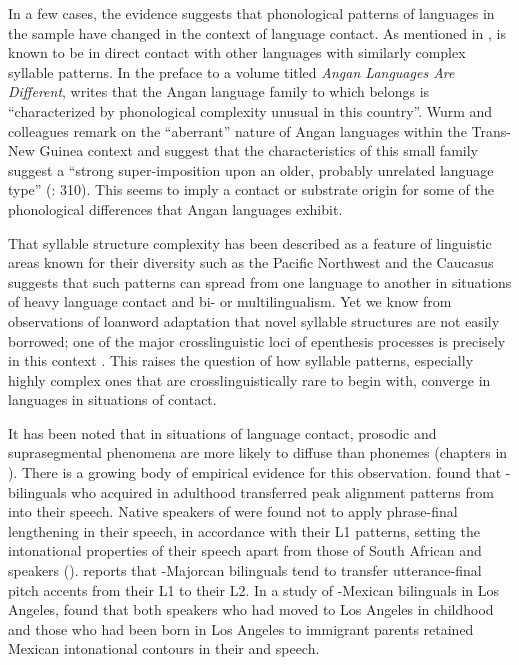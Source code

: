   In a few cases, the evidence suggests that phonological patterns of languages in the sample have changed in the context of language contact. As mentioned in ,  is known to be in direct contact with other languages with similarly complex syllable patterns. In the preface to a volume titled \textit{Angan Languages Are Different}, \citet[4]{Healey1981} writes that the Angan language family to which  belongs is “characterized by phonological complexity unusual in this country”. Wurm and colleagues remark on the “aberrant” nature of Angan languages within the Trans-New Guinea context and suggest that the characteristics of this small family suggest a “strong super-imposition upon an older, probably unrelated language type” (\citeyear{WurmEtAl1977}: 310). This seems to imply a contact or substrate origin for some of the phonological differences that Angan languages exhibit.

  That syllable structure complexity has been described as a feature of linguistic areas known for their diversity such as the Pacific Northwest and the Caucasus suggests that such patterns can spread from one language to another in situations of heavy language contact and bi- or multilingualism. Yet we know from observations of loanword adaptation that novel syllable structures are not easily borrowed; one of the major crosslinguistic loci of epenthesis processes is precisely in this context \citep{Hall2011}. This raises the question of how syllable patterns, especially highly complex ones that are crosslinguistically rare to begin with, converge in languages in situations of contact.

  It has been noted that in situations of language contact, prosodic and suprasegmental phenomena are more likely to diffuse than phonemes (chapters in \citealt{AikhenvaldDixon2001b}). There is a growing body of empirical evidence for this observation. \citet{Mennen2004} found that - bilinguals who acquired  in adulthood transferred peak alignment patterns from  into their  speech. Native speakers of  were found not to apply phrase-final lengthening in their  speech, in accordance with their L1 patterns, setting the intonational properties of their speech apart from those of South African  and   speakers (\citealt{CoetzeeWissing2007}). \citet{Simonet2011} reports that -Majorcan  bilinguals tend to transfer utterance-final pitch accents from their L1 to their L2. In a study of -Mexican  bilinguals in Los Angeles, \citet{Robles-Puente2014} found that both speakers who had moved to Los Angeles in childhood and those who had been born in Los Angeles to immigrant parents retained Mexican  intonational contours in their  and  speech.

